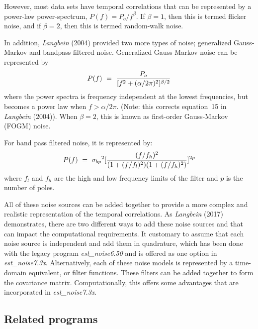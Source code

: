 \documentclass[12pt]{amsart}
\begin{document}
However, most data sets have temporal correlations that can be represented by a power-law power-spectrum, $P(f)=P_o/f^{\beta}$. If $\beta =1$, then this is termed flicker noise, and if $\beta =2$, then this is termed random-walk noise.

In addition, \textit{Langbein} (2004) provided two more types of noise; generalized Gauss-Markov and bandpass filtered noise.
Generalized Gauss Markov noise can be represented by
\begin{equation}
P(f)~= ~{{P_o} \over [f^2 + ({\alpha}/{2{\pi}})^2]^{{\beta}/2}}
\end{equation}
where the power spectra is frequency independent at the lowest frequencies, but becomes a power law when $f > {\alpha}/{2{\pi}}$. (Note: this corrects equation~15 in \textit{Langbein} (2004)). When $\beta=2$, this is known as first-order Gauss-Markov (FOGM) noise.

For band pass filtered noise, it is represented by:
\begin{equation}
P(f)~= ~{{\sigma_{bp}}^2  [ {{(f/f_h)^2} \over {(1 + (f/f_l)^2)(1 + (f/f_h)^2)} }] ^{2p}}
\end{equation}
where $f_l$ and $f_h$ are the high and low frequency limits of the filter and $p$ is the number of poles.

All of these noise sources can be added together to provide a more complex and realistic representation of the temporal correlations.  As \textit{Langbein} (2017) demonstrates, there are two different ways to add these noise sources and
that can impact the computational requirements.  It customary to assume that each noise source is independent
and add them in quadrature, which has been done with the legacy program \textit{est\_noise6.50} and is offered
as one option in \textit{est\_noise7.3x}.  Alternatively, each of these noise models is represented by
a time-domain equivalent, or filter functions.  These filters can be added together to form the covariance
matrix. Computationally, this offers some advantages that are incorporated in \textit{est\_noise7.3x}.

\subsection{Related programs}
\end{document}
